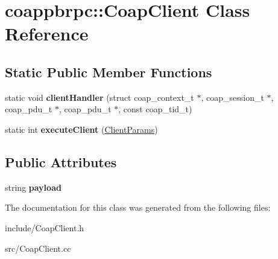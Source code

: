\hypertarget{classcoappbrpc_1_1CoapClient}{}\section{coappbrpc\+:\+:Coap\+Client Class Reference}
\label{classcoappbrpc_1_1CoapClient}
\subsection*{Static Public Member Functions}
\begin{DoxyCompactItemize}
\item 
\mbox{\label{classcoappbrpc_1_1CoapClient_ab27b2485df1e7213425fe0f1b75110fa}} 
static void {\bfseries client\+Handler} (struct coap\+\_\+context\+\_\+t $\ast$, coap\+\_\+session\+\_\+t $\ast$, coap\+\_\+pdu\+\_\+t $\ast$, coap\+\_\+pdu\+\_\+t $\ast$, const coap\+\_\+tid\+\_\+t)
\item 
\mbox{\label{classcoappbrpc_1_1CoapClient_ac622e2dd087135defc27d8d4401a3119}} 
static int {\bfseries execute\+Client} (\hyperlink{structClientParams}{Client\+Params})
\end{DoxyCompactItemize}
\subsection*{Public Attributes}
\begin{DoxyCompactItemize}
\item 
\mbox{\label{classcoappbrpc_1_1CoapClient_ae6909f236ca1cd6b8b6343b7827ea004}} 
string {\bfseries payload}
\end{DoxyCompactItemize}


The documentation for this class was generated from the following files\+:\begin{DoxyCompactItemize}
\item 
include/Coap\+Client.\+h\item 
src/Coap\+Client.\+cc\end{DoxyCompactItemize}
